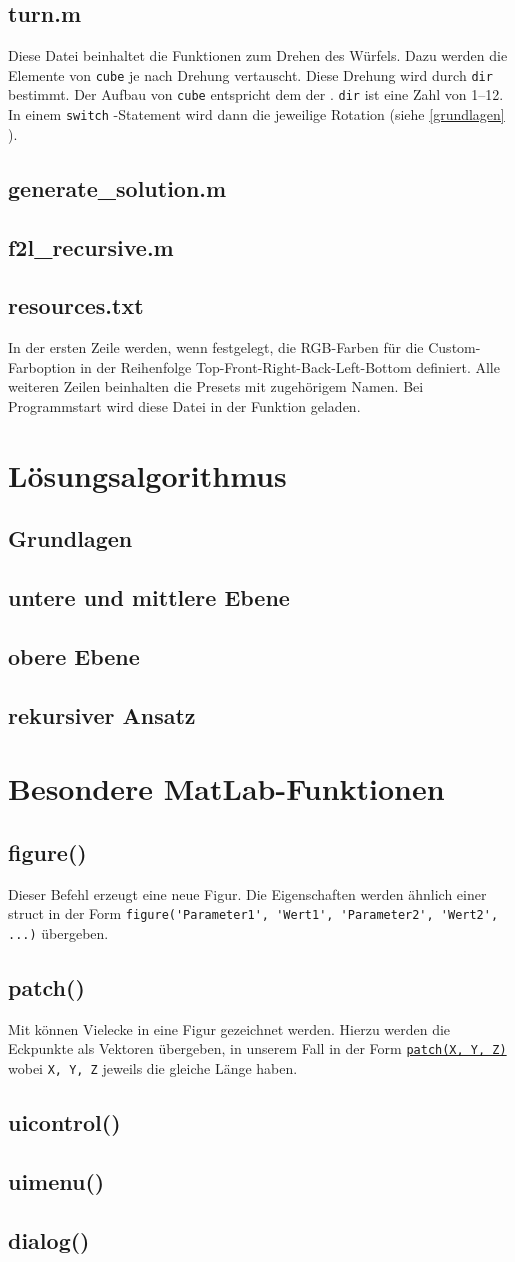 \documentclass[a4paper,11pt]{scrreprt}
\newcommand{\coderef}[1]{
  \texttt{\nameref{#1}}
}
\newcommand{\codeinline}[1]{
  \lstinline!#1!
}
\newcommand{\codecustomref}[2]{
  \hyperref[#2]{\lstinline!#1!}
}
\newcommand{\chap}[2]{
  \chapter{#1}\label{#2}
}
\renewcommand{\sec}[2]{
  \section{#1}\label{#2}
}
\begin{document}
    \sec{turn.m}{turn}
      Diese Datei beinhaltet die Funktionen zum Drehen des Würfels. Dazu werden die Elemente von \codeinline{cube} je nach Drehung vertauscht. Diese Drehung wird durch \codeinline{dir} bestimmt. Der Aufbau von \codeinline{cube} entspricht dem der \coderef{facecolors}. \codeinline{dir} ist eine Zahl von 1--12. In einem \codeinline{switch}-Statement wird dann die jeweilige Rotation (siehe \autoref{grundlagen} ).

    \sec{generate\_solution.m}{generatesolution}

    \sec{f2l\_recursive.m}{f2lrecursive}

    \sec{resources.txt}{resources}
      In der ersten Zeile werden, wenn festgelegt, die RGB-Farben für die Custom-Farboption in der Reihenfolge Top-Front-Right-Back-Left-Bottom definiert. Alle weiteren Zeilen beinhalten die Presets mit zugehörigem Namen. Bei Programmstart wird diese Datei in der Funktion \coderef{loadpresets} geladen.

  \chap{Lösungsalgorithmus}{algorithm}
    \sec{Grundlagen}{grundlagen}

    \sec{untere und mittlere Ebene}{f2l}

    \sec{obere Ebene}{oben}

    \sec{rekursiver Ansatz}{recursive}

  \chap{Besondere MatLab-Funktionen}{matlab}
    \sec{figure()}{figure}
      Dieser Befehl erzeugt eine neue Figur. Die Eigenschaften werden ähnlich einer struct in der Form \codeinline{figure('Parameter1', 'Wert1', 'Parameter2', 'Wert2', ...)} übergeben.

    \sec{patch()}{patch}
      Mit \coderef{patch} können Vielecke in eine Figur gezeichnet werden. Hierzu werden die Eckpunkte als Vektoren übergeben, in unserem Fall in der Form \codecustomref{patch(X, Y, Z)}{patch} wobei \codeinline{X, Y, Z} jeweils die gleiche Länge haben.
    \sec{uicontrol()}{uicontrol}

    \sec{uimenu()}{uimenu}

    \sec{dialog()}{dialog}
\end{document}
